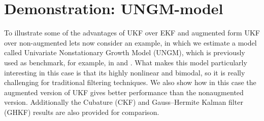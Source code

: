%
%




















%
\section{Demonstration: UNGM-model}
%

To illustrate some of the advantages of UKF over EKF and augmented
form UKF over non-augmented lets now consider an example, in which we
estimate a model called Univariate Nonstationary Growth Model (UNGM),
which is previously used as benchmark, for example, in \citet{Kotecha+Djuric:2003} and \citet{Wu+Hu+Wu+Hu:2005}. What makes this model
particularly interesting in this case is that its highly nonlinear and
bimodal, so it is really challenging for traditional filtering
techniques. We also show how in this case the augmented version of UKF
gives better performance than the nonaugmented version. Additionally the 
Cubature (CKF) and Gauss--Hermite Kalman filter (GHKF) results are
also provided for comparison.

